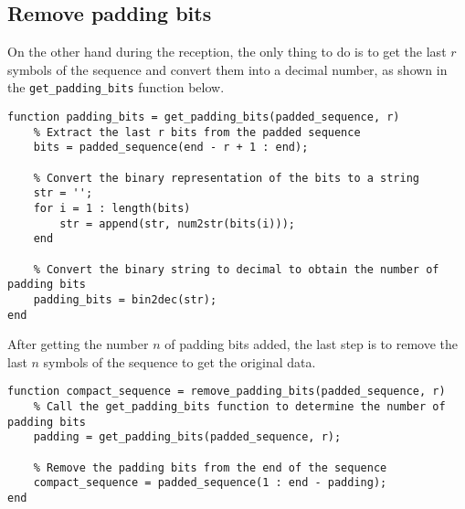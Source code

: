 \subsection{Remove padding bits}
On the other hand during the reception, the only thing to do is to get the last $r$ symbols of the sequence and convert them into a decimal number, as shown in the \texttt{get\_padding\_bits} function below.

\begin{lstlisting}
function padding_bits = get_padding_bits(padded_sequence, r)
    % Extract the last r bits from the padded sequence
    bits = padded_sequence(end - r + 1 : end);
    
    % Convert the binary representation of the bits to a string
    str = '';
    for i = 1 : length(bits)
        str = append(str, num2str(bits(i)));
    end
    
    % Convert the binary string to decimal to obtain the number of padding bits
    padding_bits = bin2dec(str);
end
\end{lstlisting}

\noindent After getting the number $n$ of padding bits added, the last step is to remove the last $n$ symbols of the sequence to get the original data.

\begin{lstlisting}
function compact_sequence = remove_padding_bits(padded_sequence, r)
    % Call the get_padding_bits function to determine the number of padding bits
    padding = get_padding_bits(padded_sequence, r);

    % Remove the padding bits from the end of the sequence
    compact_sequence = padded_sequence(1 : end - padding);
end
\end{lstlisting}

